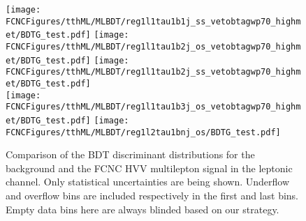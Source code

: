 \begin{figure}[htb]
\centering
\texttt{[image: \\FCNCFigures/tthML/MLBDT/reg1l1tau1b1j\_ss\_vetobtagwp70\_highmet/BDTG\_test.pdf]}
\texttt{[image: \\FCNCFigures/tthML/MLBDT/reg1l1tau1b2j\_os\_vetobtagwp70\_highmet/BDTG\_test.pdf]}
\texttt{[image: \\FCNCFigures/tthML/MLBDT/reg1l1tau1b2j\_ss\_vetobtagwp70\_highmet/BDTG\_test.pdf]}
\\
\texttt{[image: \\FCNCFigures/tthML/MLBDT/reg1l1tau1b3j\_os\_vetobtagwp70\_highmet/BDTG\_test.pdf]}
\texttt{[image: \\FCNCFigures/tthML/MLBDT/reg1l2tau1bnj\_os/BDTG\_test.pdf]}
\\
\caption{ Comparison of the BDT discriminant distributions for the background and the FCNC HVV multilepton signal in the leptonic channel. Only statistical uncertainties are being shown. Underflow and overflow bins are included respectively in the first and last bins. Empty data bins here are always blinded based on our strategy.}
\label{fig:check_BDT_HWW}
\end{figure}

\clearpage

